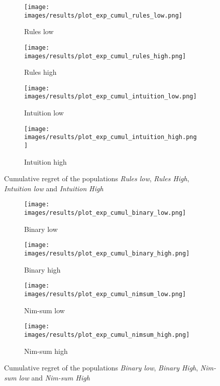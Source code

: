 
\begin{figure}[ht]
	\begin{subfigure}{0.49\linewidth}
	\centering
	\texttt{[image: images/results/plot\_exp\_cumul\_rules\_low.png]}
	\caption{Rules low}
	\label{fig:exp_cumul_rules_low}
	\end{subfigure}
	\hfill
	\begin{subfigure}{0.49\linewidth}
	\centering
	\texttt{[image: images/results/plot\_exp\_cumul\_rules\_high.png]}
	\caption{Rules high}
	\label{fig:exp_cumul_rules_high}
	\end{subfigure}
	\begin{subfigure}{0.49\linewidth}
	\centering
	\texttt{[image: images/results/plot\_exp\_cumul\_intuition\_low.png]}
	\caption{Intuition low}
	\label{fig:exp_cumul_intuition_low}
	\end{subfigure}
	\hfill
	\begin{subfigure}{0.49\linewidth}
	\centering
	\texttt{[image: images/results/plot\_exp\_cumul\_intuition\_high.png]}
	\caption{Intuition high}
	\label{fig:exp_cumul_intuition_high}
	\end{subfigure}
	\caption{Cumulative regret of the populations \emph{Rules low}, \emph{Rules
	High}, \emph{Intuition low} and \emph{Intuition High}}
	\label{fig:exp_cumul1}
\end{figure}
\begin{figure}[ht]
	\begin{subfigure}{0.49\linewidth}
	\centering
	\texttt{[image: images/results/plot\_exp\_cumul\_binary\_low.png]}
	\caption{Binary low}
	\label{fig:exp_cumul_binary_low}
	\end{subfigure}
	\hfill
	\begin{subfigure}{0.49\linewidth}
	\centering
	\texttt{[image: images/results/plot\_exp\_cumul\_binary\_high.png]}
	\caption{Binary high}
	\label{fig:exp_cumul_binary_high}
	\end{subfigure}
	\begin{subfigure}{0.49\linewidth}
	\centering
	\texttt{[image: images/results/plot\_exp\_cumul\_nimsum\_low.png]}
	\caption{Nim-sum low}
	\label{fig:exp_cumul_nimsum_low}
	\end{subfigure}
	\hfill
	\begin{subfigure}{0.49\linewidth}
	\centering
	\texttt{[image: images/results/plot\_exp\_cumul\_nimsum\_high.png]}
	\caption{Nim-sum high}
	\label{fig:exp_cumul_nimsum_high}
	\end{subfigure}
	\caption{Cumulative regret of the populations \emph{Binary low},
	\emph{Binary High}, \emph{Nim-sum low} and \emph{Nim-sum High}}
	\label{fig:exp_cumul2}
\end{figure}


